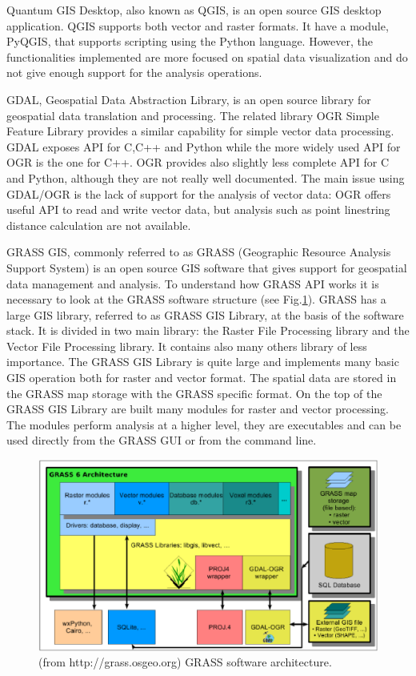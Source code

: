 \documentclass[12pt,a4paper,twoside]{book}
\begin{document}
Quantum GIS Desktop, also known as QGIS, is an open source GIS desktop application. QGIS supports both vector and raster formats. It have a module, PyQGIS, that supports scripting using the Python language. However, the functionalities implemented are more focused on spatial data visualization and do not give enough support for the analysis operations.

GDAL, Geospatial Data Abstraction Library, is an open source library for geospatial data translation and processing. The related library OGR Simple Feature Library provides a similar capability for simple vector data processing. GDAL exposes API for C,C++ and Python while the more widely used API for OGR is the one for C++. OGR provides also slightly less complete API for C and Python, although they are not really well documented. The main issue using GDAL/OGR is the lack of support for the analysis of vector data: OGR offers useful API to read and write vector data, but analysis such as point linestring distance calculation are not available.

GRASS GIS, commonly referred to as GRASS (Geographic Resource Analysis Support System) is an open source GIS software that gives support for geospatial data management and analysis. To understand how GRASS API works it is necessary to look at the GRASS software structure (see Fig.\ref{grass_structure}). GRASS has a large GIS library, referred to as GRASS GIS Library, at the basis of the software stack. It is divided in two main library: the Raster File Processing library and the Vector File Processing library. It contains also many others library of less importance. The GRASS GIS Library is quite large and implements many basic GIS operation both for raster and vector format. The spatial data are stored in the GRASS map storage with the GRASS specific format. On the top of the GRASS GIS Library are built many modules for raster and vector processing. The modules perform analysis at a higher level, they are executables and can be used directly from the GRASS GUI or from the command line.

\begin{figure}
  \begin{center}
    \includegraphics[width=\textwidth]{images/grass6_arch.eps}
    \caption{(from http://grass.osgeo.org) GRASS software architecture.}\label{grass_structure}
  \end{center}
\end{figure}
\end{document}
